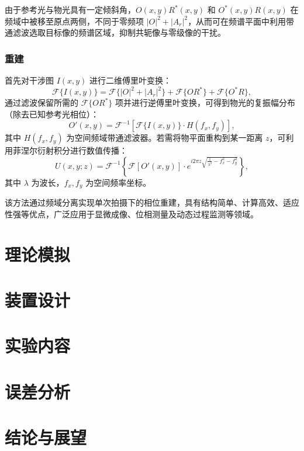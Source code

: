 \documentclass[a4paper]{report} %
\begin{document}
由于参考光与物光具有一定倾斜角，$O(x,y) R^*(x,y)$ 和 $O^*(x,y) R(x,y)$ 在频域中被移至原点两侧，不同于零频项 $|O|^2 + |A_r|^2$，从而可在频谱平面中利用带通滤波选取目标像的频谱区域，抑制共轭像与零级像的干扰。
\subsection{重建}
首先对干涉图 $I(x,y)$ 进行二维傅里叶变换：
\begin{equation}
\mathcal{F}\{I(x,y)\} = \mathcal{F}\{|O|^2 + |A_r|^2\} + \mathcal{F}\{O R^*\} + \mathcal{F}\{O^* R\},
\end{equation}
通过滤波保留所需的 $\mathcal{F}\{O R^*\}$ 项并进行逆傅里叶变换，可得到物光的复振幅分布（除去已知参考光相位）：
\begin{equation}
O'(x,y) = \mathcal{F}^{-1} \left[ \mathcal{F}\{I(x,y)\} \cdot H(f_x,f_y) \right],
\end{equation}
其中 $H(f_x,f_y)$ 为空间频域带通滤波器。若需将物平面重构到某一距离 $z$，可利用菲涅尔衍射积分进行数值传播：
\begin{equation}
U(x,y;z) = \mathcal{F}^{-1} \left\{ \mathcal{F}[O'(x,y)] \cdot e^{i 2\pi z \sqrt{\frac{1}{\lambda^2} - f_x^2 - f_y^2}} \right\},
\end{equation}
其中 $\lambda$ 为波长，$f_x,f_y$ 为空间频率坐标。

该方法通过频域分离实现单次拍摄下的相位重建，具有结构简单、计算高效、适应性强等优点，广泛应用于显微成像、位相测量及动态过程监测等领域。



\chapter{理论模拟}

\chapter{装置设计}

\chapter{实验内容}

\chapter{误差分析}

\chapter{结论与展望}
\end{document}
